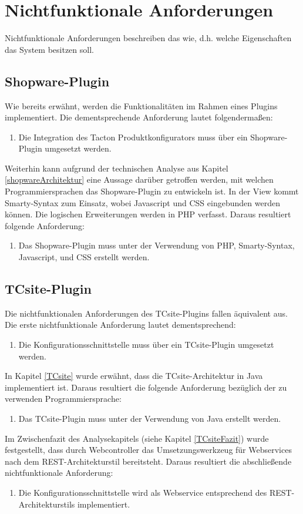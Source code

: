 \documentclass[11pt, a4paper, titlepage, listof=totoc, bibliography=totoc, index=totoc, twoside, openright, headings=normal]{scrreprt}
\begin{document}
\section{Nichtfunktionale Anforderungen}
\label{nichtfunktionaleAnforderungen}
Nichtfunktionale Anforderungen beschreiben das \glqq wie\grqq{}, d.h. welche Eigenschaften das System besitzen soll.

\subsection{Shopware-Plugin}
Wie bereits erwähnt, werden die Funktionalitäten im Rahmen eines Plugins implementiert. Die dementsprechende Anforderung lautet folgendermaßen:
\begin{enumerate}[SW.NF01:]\bfseries
\item Die Integration des Tacton Produktkonfigurators muss über ein Shopware-Plugin umgesetzt werden.
\end{enumerate}
Weiterhin kann aufgrund der technischen Analyse aus Kapitel \ref{shopwareArchitektur} eine Aussage darüber getroffen werden, mit welchen Programmiersprachen das Shopware-Plugin zu entwickeln ist. In der View kommt Smarty-Syntax zum Einsatz, wobei Javascript und CSS eingebunden werden können. Die logischen Erweiterungen werden in PHP verfasst. Daraus resultiert folgende Anforderung:
\begin{enumerate}[SW.NF02:]\bfseries
\item Das Shopware-Plugin muss unter der Verwendung von PHP, Smarty-Syntax, Javascript, und CSS erstellt werden.
\end{enumerate}

\subsection{TCsite-Plugin}
Die nichtfunktionalen Anforderungen des TCsite-Plugins fallen äquivalent aus. Die erste nichtfunktionale Anforderung lautet dementsprechend:
\begin{enumerate}[TC.NF01:]\bfseries
\item Die Konfigurationsschnittstelle muss über ein TCsite-Plugin umgesetzt werden.
\end{enumerate}
In Kapitel \ref{TCsite} wurde erwähnt, dass die TCsite-Architektur in Java implementiert ist. Daraus resultiert die folgende Anforderung bezüglich der zu verwenden Programmiersprache:
\begin{enumerate}[TC.NF02:]\bfseries
\item Das TCsite-Plugin muss unter der Verwendung von Java erstellt werden.
\end{enumerate}
Im Zwischenfazit des Analysekapitels (siehe Kapitel \ref{TCsiteFazit}) wurde festgestellt, dass durch Webcontroller das Umsetzungswerkzeug für Webservices nach dem REST-Architekturstil bereitsteht. Daraus resultiert die abschließende nichtfunktionale Anforderung:
\begin{enumerate}[TC.NF03:]\bfseries
\item Die Konfigurationsschnittstelle wird als Webservice entsprechend des REST-Architekturstils implementiert.
\end{enumerate}
\end{document}
